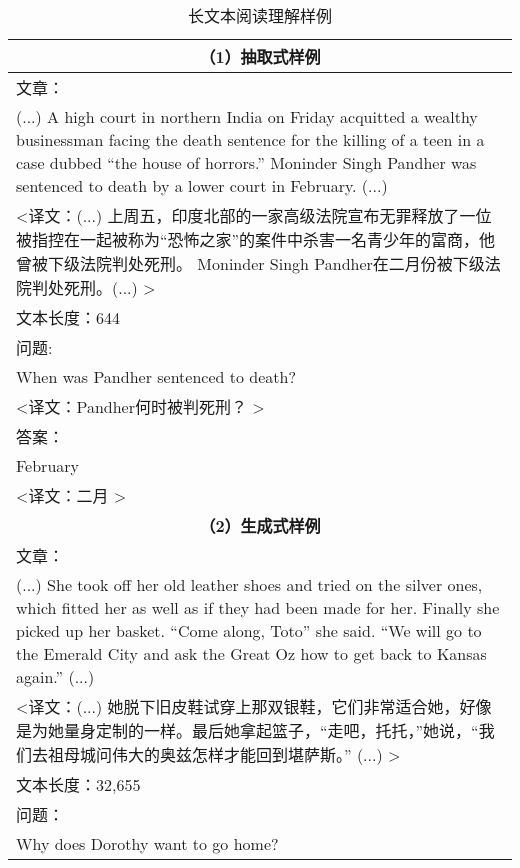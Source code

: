 \begin{table}[htbp]\scriptsize
    \centering
    \caption{长文本阅读理解样例}
    \begin{tabular}{p{408pt}}
        \hline
        \multicolumn{1}{c}{\bfseries （1）抽取式样例} \\
        \hline
        文章： \\
        (...) A high court in northern India on Friday acquitted a wealthy businessman facing the death sentence for the killing of a teen in a case dubbed ``the house of horrors.'' Moninder Singh Pandher was sentenced to death by a lower court in February. (...) \\
        <译文：(...) 上周五，印度北部的一家高级法院宣布无罪释放了一位被指控在一起被称为“恐怖之家”的案件中杀害一名青少年的富商，他曾被下级法院判处死刑。 Moninder Singh Pandher在二月份被下级法院判处死刑。(...) > \\
        \hline
        文本长度：644 \\
        \hline
        问题: \\
        When was Pandher sentenced to death?  \\
        <译文：Pandher何时被判死刑？ > \\
        \hline
        答案：\\
        February  \\
        <译文：二月 > \\
        \hline
        \multicolumn{1}{c}{\bfseries （2）生成式样例} \\
        \hline
        文章： \\
        (...) She took off her old leather shoes and tried on the silver ones, which fitted her as well as if they had been made for her. Finally she picked up her basket. ``Come along, Toto'' she said. ``We will go to the Emerald City and ask the Great Oz how to get back to Kansas again.'' (...) \\
        <译文：(...) 她脱下旧皮鞋试穿上那双银鞋，它们非常适合她，好像是为她量身定制的一样。最后她拿起篮子，“走吧，托托，”她说，“我们去祖母城问伟大的奥兹怎样才能回到堪萨斯。” (...) > \\
        \hline
        文本长度：32,655 \\
        \hline
        问题：\\
        Why does Dorothy want to go home? \\

\end{tabular}
\end{table}
